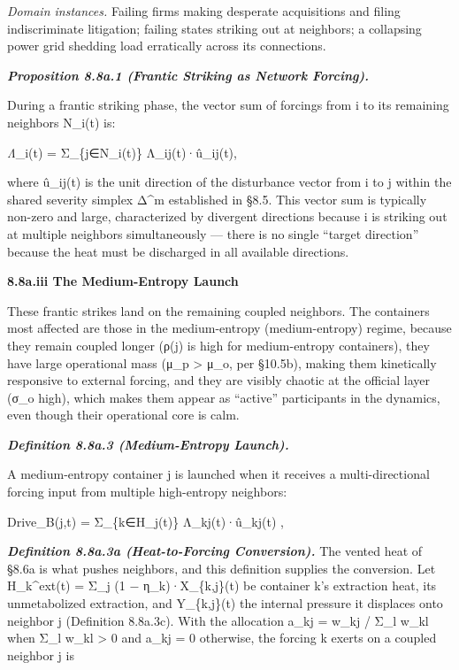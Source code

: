 \documentclass[
]{article}
\begin{document}
\emph{Domain instances.} Failing firms making desperate acquisitions and
filing indiscriminate litigation; failing states striking out at
neighbors; a collapsing power grid shedding load erratically across its
connections.

\emph{\textbf{Proposition 8.8a.1 (Frantic Striking as Network
Forcing).}}

During a frantic striking phase, the vector sum of forcings from i to
its remaining neighbors N\_i(t) is:

\emph{Λ⃗}\_i(t) = Σ\_\{j∈N\_i(t)\} Λ\_ij(t)·û\_ij(t),

where û\_ij(t) is the unit direction of the disturbance vector from i to
j within the shared severity simplex Δ\^{}m established in §8.5. This
vector sum is typically non-zero and large, characterized by divergent
directions because i is striking out at multiple neighbors
simultaneously --- there is no single ``target direction'' because the
heat must be discharged in all available directions.

\textbf{8.8a.iii The Medium-Entropy Launch}

These frantic strikes land on the remaining coupled neighbors. The
containers most affected are those in the medium-entropy
(medium-entropy) regime, because they remain coupled longer (ρ(j) is
high for medium-entropy containers), they have large operational mass
(μ\_p \textgreater{} μ\_o, per §10.5b), making them kinetically
responsive to external forcing, and they are visibly chaotic at the
official layer (σ\_o high), which makes them appear as ``active''
participants in the dynamics, even though their operational core is
calm.

\emph{\textbf{Definition 8.8a.3 (Medium-Entropy Launch).}}

A medium-entropy container j is launched when it receives a
multi-directional forcing input from multiple high-entropy neighbors:

Drive\_B(j,t) = Σ\_\{k∈H\_j(t)\} Λ\_kj(t)·û\_kj(t) ,

\emph{\textbf{Definition 8.8a.3a (Heat-to-Forcing Conversion).}} The
vented heat of §8.6a is what pushes neighbors, and this definition
supplies the conversion. Let H\_k\^{}ext(t) = Σ\_j (1 −
η\_k)·X\_\{k,j\}(t) be container k's extraction heat, its unmetabolized
extraction, and Y\_\{k,j\}(t) the internal pressure it displaces onto
neighbor j (Definition 8.8a.3c). With the allocation a\_kj = w\_kj /
Σ\_l w\_kl when Σ\_l w\_kl \textgreater{} 0 and a\_kj = 0 otherwise, the
forcing k exerts on a coupled neighbor j is
\end{document}
